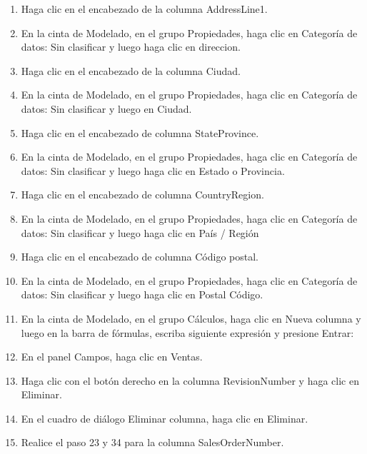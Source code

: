 \documentclass[12pt,letterpaper]{article}
\begin{document}
\begin{enumerate}
     \item Haga clic en el encabezado de la columna AddressLine1.
    
    \item En la cinta de Modelado, en el grupo Propiedades, haga clic en Categoría de datos: Sin clasificar y luego haga clic en direccion.
    
    
    
    \item Haga clic en el encabezado de la columna Ciudad.
    \item En la cinta de Modelado, en el grupo Propiedades, haga clic en Categoría de datos: Sin clasificar y luego en Ciudad.
     
    \item Haga clic en el encabezado de columna StateProvince. 
    \item En la cinta de Modelado, en el grupo Propiedades, haga clic en Categoría de datos: Sin clasificar y luego haga clic en Estado o Provincia.

    \item Haga clic en el encabezado de columna CountryRegion.
    
    \item En la cinta de Modelado, en el grupo Propiedades, haga clic en Categoría de datos: Sin clasificar y luego haga clic en País / Región

 
    \item Haga clic en el encabezado de columna Código postal.
    \item En la cinta de Modelado, en el grupo Propiedades, haga clic en Categoría de datos: Sin clasificar y luego haga clic en Postal Código.

 
    \item En la cinta de Modelado, en el grupo Cálculos, haga clic en Nueva columna y luego en la barra de fórmulas, escriba
siguiente expresión y presione Entrar:



    \item En el panel Campos, haga clic en Ventas. 
    
    
    
    \item Haga clic con el botón derecho en la columna RevisionNumber y haga clic en Eliminar.
     
    \item En el cuadro de diálogo Eliminar columna, haga clic en Eliminar.
    
    \item Realice el paso 23 y 34 para la columna SalesOrderNumber.
    

\end{enumerate}
\end{document}
